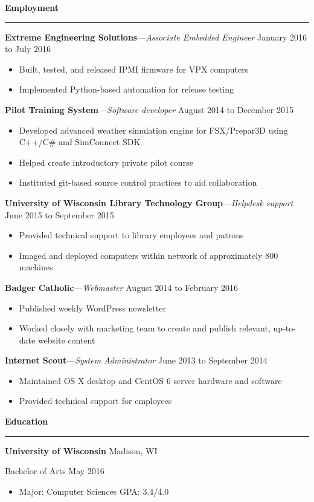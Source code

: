 \documentclass[12pt,letterpaper]{article}
\newenvironment{details}{
    \vspace{-.8em}
    \begin{itemize}
        \renewcommand \labelitemi{\labelitemiv}
        \setlength{\itemsep}{0pt}
        \setlength{\parskip}{-1pt}
        \setlength{\parsep}{0pt}
    }{
    \end{itemize}
    \vspace{-.5em}
}
\newcommand{\hr} {
    \vspace{-1em}
    \par\rule{\textwidth}{1pt}
    \vspace{-1.5em}
}
\newcommand{\ressection}[1] {
    \par{\large \textbf{#1}}
    \hr
}
\newenvironment{employment} {
    \setlength{\parskip}{0pt}
    \ressection{Employment}
}{
    \vspace{0.5em}
}
\newenvironment{education} {
    \ressection{Education}
}{
    \vspace{0.5em}
}
\newcommand{\employer}[3] {
    \vspace{3pt}
    {\par\textbf{#1}---\textit{#2} \hfill #3}
    \vspace{3pt}
    \par
}
\newcommand{\educator}[4] {
    \textbf{#1}
    \hfill #2
    \par #3 \hfill #4
    \par%
    \vspace{3pt}
}
\begin{document}
\begin{employment}
\employer{Extreme Engineering Solutions}{Associate Embedded Engineer}{January 2016 to July 2016}
\begin{details}
    \item Built, tested, and released IPMI firmware for VPX computers
    \item Implemented Python-based automation for release testing
\end{details}

\employer{Pilot Training System}{Software developer}{August 2014 to December 2015}
\begin{details}
    \item Developed advanced weather simulation engine for FSX/Prepar3D using C++/C\# and SimConnect SDK
    \item Helped create introductory private pilot course
    \item Instituted git-based source control practices to aid collaboration
\end{details}

\employer{University of Wisconsin Library Technology Group}{Helpdesk support}{June 2015 to September 2015}
\begin{details}
    \item Provided technical support to library employees and patrons
    \item Imaged and deployed computers within network of approximately 800 machines
\end{details}

\employer{Badger Catholic}{Webmaster}{August 2014 to February 2016}
\begin{details}
    \item Published weekly WordPress newsletter
    \item Worked closely with marketing team to create and publish relevant, up-to-date website content
\end{details}

\employer{Internet Scout}{System Administrator}{June 2013 to September 2014}
\begin{details}
    \item Maintained OS X desktop and CentOS 6 server hardware and software
    \item Provided technical support for employees
\end{details}

\end{employment}

\begin{education}

\educator{University of Wisconsin}{Madison, WI}{Bachelor of Arts}{May 2016}
\begin{details}
    \item Major: Computer Sciences \hfill GPA: 3.4/4.0
\end{details}

\end{education}
\end{document}
